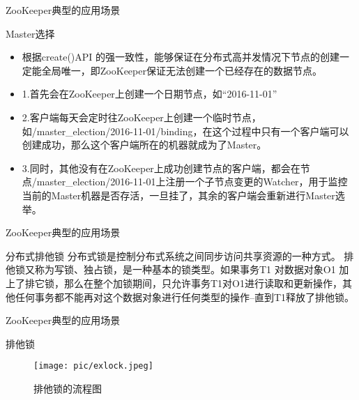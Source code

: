 \documentclass[10pt]{beamer}
\begin{document}
\begin{frame}[fragile]{ZooKeeper典型的应用场景}
  \begin{alertblock}{Master选择}
    \begin{itemize}
      \item 根据create()API 的强一致性，能够保证在分布式高并发情况下节点的创建一定能全局唯一，即ZooKeeper保证无法创建一个已经存在的数据节点。
      \item 1.首先会在ZooKeeper上创建一个日期节点，如“2016-11-01”
      \item 2.客户端每天会定时往ZooKeeper上创建一个临时节点，如/master\_election/2016-11-01/binding，在这个过程中只有一个客户端可以创建成功，那么这个客户端所在的机器就成为了Master。
      \item 3.同时，其他没有在ZooKeeper上成功创建节点的客户端，都会在节点/master\_election/2016-11-01上注册一个子节点变更的Watcher，用于监控当前的Master机器是否存活，一旦挂了，其余的客户端会重新进行Master选举。
    \end{itemize}
  \end{alertblock}
\end{frame}

\begin{frame}[fragile]{ZooKeeper典型的应用场景}
  \begin{alertblock}{分布式排他锁}
    分布式锁是控制分布式系统之间同步访问共享资源的一种方式。\newline
    排他锁又称为写锁、独占锁，是一种基本的锁类型。如果事务T1 对数据对象O1 加上了排它锁，那么在整个加锁期间，只允许事务T1对O1进行读取和更新操作，其他任何事务都不能再对这个数据对象进行任何类型的操作--直到T1释放了排他锁。
  \end{alertblock}
\end{frame}

\begin{frame}[fragile]{ZooKeeper典型的应用场景}
  \begin{alertblock}{排他锁}
    \newline\newline
    \begin{figure}
      \texttt{[image: pic/exlock.jpeg]}
      \caption{排他锁的流程图}
    \end{figure}
  \end{alertblock}
\end{frame}
\end{document}
